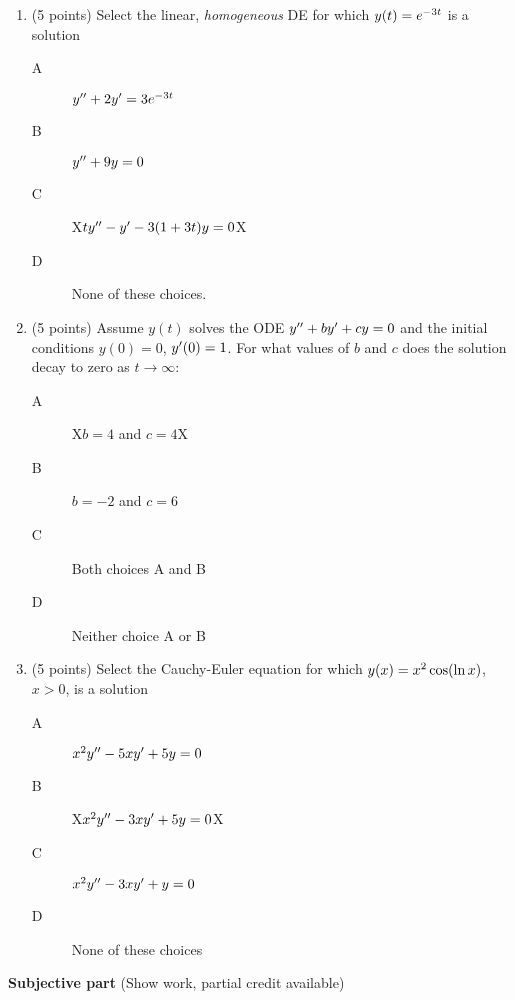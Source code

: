 \documentclass{article}
\begin{document}
\begin{enumerate}

\item (5 points) Select the linear, {\em homogeneous} DE for which $y(t)=e\sp{-3t}$ is a solution
\begin{description}
\item[A] $y\sp{\prime\prime}+2y\sp\prime=3e\sp{-3t}$
\item[B] $y\sp{\prime\prime}+9y=0$
\item[C] X$ty\sp{\prime\prime}-y\sp\prime-3(1+3t)y=0$X
\item[D] None of these choices.
\end{description}

\item (5 points) Assume $y(t)$ solves the ODE $y\sp{\prime\prime}+by\sp\prime+cy=0$ and the initial conditions $y(0)=0$, $y\sp\prime(0)=1$.  For what values of $b$ and $c$ does the solution decay to zero as $t\rightarrow\infty$:
\begin{description}
\item[A] X$b=4$ and $c=4$X
\item[B] $b=-2$ and $c=6$
\item[C] Both choices A and B
\item[D] Neither choice A or B
\end{description}

\item (5 points) Select the Cauchy-Euler equation for which $y(x)=x\sp2\cos(\ln x)$, $x>0$, is a solution
\begin{description}
\item[A] $x\sp2y\sp{\prime\prime}-5xy\sp\prime+5y=0$
\item[B] X$x\sp2y\sp{\prime\prime}-3xy\sp\prime+5y=0$X
\item[C] $x\sp2y\sp{\prime\prime}-3xy\sp\prime+y=0$
\item[D] None of these choices
\end{description}

\end{enumerate}

\newpage\noindent
{\bf Subjective part} (Show work, partial credit available)
\end{document}
